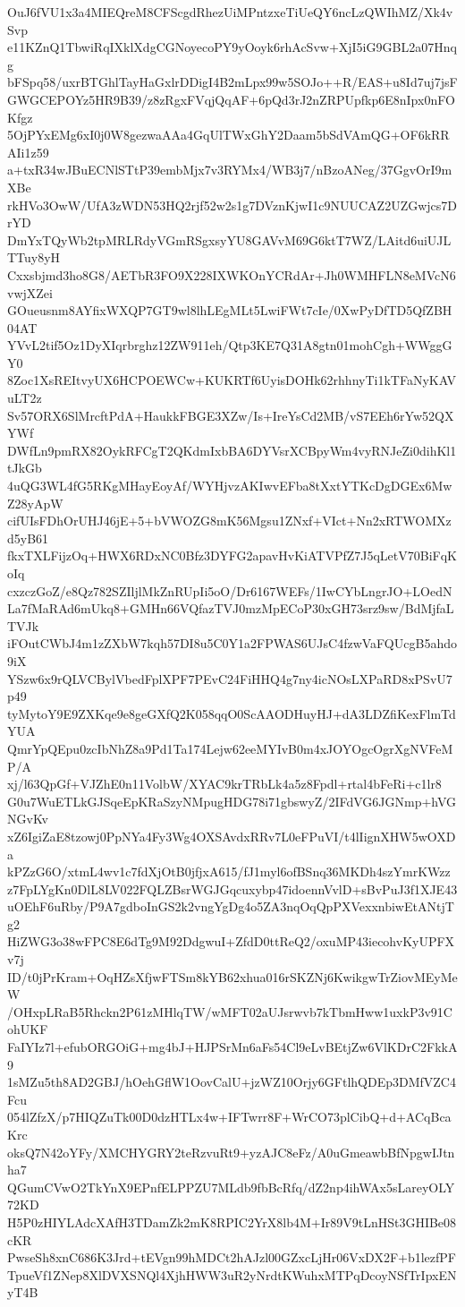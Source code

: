 OuJ6fVU1x3a4MIEQreM8CFScgdRhezUiMPntzxeTiUeQY6ncLzQWIhMZ/Xk4vSvp
e11KZnQ1TbwiRqIXklXdgCGNoyecoPY9yOoyk6rhAcSvw+XjI5iG9GBL2a07Hnqg
bFSpq58/uxrBTGhlTayHaGxlrDDigI4B2mLpx99w5SOJo++R/EAS+u8Id7uj7jsF
GWGCEPOYz5HR9B39/z8zRgxFVqjQqAF+6pQd3rJ2nZRPUpfkp6E8nIpx0nFOKfgz
5OjPYxEMg6xI0j0W8gezwaAAa4GqUlTWxGhY2Daam5bSdVAmQG+OF6kRRAIi1z59
a+txR34wJBuECNlSTtP39embMjx7v3RYMx4/WB3j7/nBzoANeg/37GgvOrI9mXBe
rkHVo3OwW/UfA3zWDN53HQ2rjf52w2s1g7DVznKjwI1c9NUUCAZ2UZGwjcs7DrYD
DmYxTQyWb2tpMRLRdyVGmRSgxsyYU8GAVvM69G6ktT7WZ/LAitd6uiUJLTTuy8yH
Cxxsbjmd3ho8G8/AETbR3FO9X228IXWKOnYCRdAr+Jh0WMHFLN8eMVcN6vwjXZei
GOueusnm8AYfixWXQP7GT9wl8lhLEgMLt5LwiFWt7cIe/0XwPyDfTD5QfZBH04AT
YVvL2tif5Oz1DyXIqrbrghz12ZW911eh/Qtp3KE7Q31A8gtn01mohCgh+WWggGY0
8Zoc1XsREItvyUX6HCPOEWCw+KUKRTf6UyisDOHk62rhhnyTi1kTFaNyKAVuLT2z
Sv57ORX6SlMrcftPdA+HaukkFBGE3XZw/Is+IreYsCd2MB/vS7EEh6rYw52QXYWf
DWfLn9pmRX82OykRFCgT2QKdmIxbBA6DYVsrXCBpyWm4vyRNJeZi0dihKl1tJkGb
4uQG3WL4fG5RKgMHayEoyAf/WYHjvzAKIwvEFba8tXxtYTKcDgDGEx6MwZ28yApW
cifUIsFDhOrUHJ46jE+5+bVWOZG8mK56Mgsu1ZNxf+VIct+Nn2xRTWOMXzd5yB61
fkxTXLFijzOq+HWX6RDxNC0Bfz3DYFG2apavHvKiATVPfZ7J5qLetV70BiFqKoIq
cxzczGoZ/e8Qz782SZIljlMkZnRUpIi5oO/Dr6167WEFs/1IwCYbLngrJO+LOedN
La7fMaRAd6mUkq8+GMHn66VQfazTVJ0mzMpECoP30xGH73srz9sw/BdMjfaLTVJk
iFOutCWbJ4m1zZXbW7kqh57DI8u5C0Y1a2FPWAS6UJsC4fzwVaFQUcgB5ahdo9iX
YSzw6x9rQLVCBylVbedFplXPF7PEvC24FiHHQ4g7ny4icNOsLXPaRD8xPSvU7p49
tyMytoY9E9ZXKqe9e8geGXfQ2K058qqO0ScAAODHuyHJ+dA3LDZfiKexFlmTdYUA
QmrYpQEpu0zcIbNhZ8a9Pd1Ta174Lejw62eeMYIvB0m4xJOYOgcOgrXgNVFeMP/A
xj/l63QpGf+VJZhE0n11VolbW/XYAC9krTRbLk4a5z8Fpdl+rtal4bFeRi+c1lr8
G0u7WuETLkGJSqeEpKRaSzyNMpugHDG78i71gbswyZ/2IFdVG6JGNmp+hVGNGvKv
xZ6IgiZaE8tzowj0PpNYa4Fy3Wg4OXSAvdxRRv7L0eFPuVI/t4lIignXHW5wOXDa
kPZzG6O/xtmL4wv1c7fdXjOtB0jfjxA615/fJ1myl6ofBSnq36MKDh4szYmrKWzz
z7FpLYgKn0DlL8LV022FQLZBsrWGJGqcuxybp47idoennVvlD+sBvPuJ3f1XJE43
uOEhF6uRby/P9A7gdboInGS2k2vngYgDg4o5ZA3nqOqQpPXVexxnbiwEtANtjTg2
HiZWG3o38wFPC8E6dTg9M92DdgwuI+ZfdD0ttReQ2/oxuMP43iecohvKyUPFXv7j
ID/t0jPrKram+OqHZsXfjwFTSm8kYB62xhua016rSKZNj6KwikgwTrZiovMEyMeW
/OHxpLRaB5Rhckn2P61zMHlqTW/wMFT02aUJsrwvb7kTbmHww1uxkP3v91CohUKF
FaIYIz7l+efubORGOiG+mg4bJ+HJPSrMn6aFs54Cl9eLvBEtjZw6VlKDrC2FkkA9
1sMZu5th8AD2GBJ/hOehGflW1OovCalU+jzWZ10Orjy6GFtlhQDEp3DMfVZC4Fcu
054lZfzX/p7HIQZuTk00D0dzHTLx4w+IFTwrr8F+WrCO73plCibQ+d+ACqBcaKrc
oksQ7N42oYFy/XMCHYGRY2teRzvuRt9+yzAJC8eFz/A0uGmeawbBfNpgwIJtnha7
QGumCVwO2TkYnX9EPnfELPPZU7MLdb9fbBcRfq/dZ2np4ihWAx5sLareyOLY72KD
H5P0zHIYLAdcXAfH3TDamZk2mK8RPIC2YrX8lb4M+Ir89V9tLnHSt3GHIBe08cKR
PwseSh8xnC686K3Jrd+tEVgn99hMDCt2hAJzl00GZxcLjHr06VxDX2F+b1lezfPF
TpueVf1ZNep8XlDVXSNQl4XjhHWW3uR2yNrdtKWuhxMTPqDcoyNSfTrIpxENyT4B
